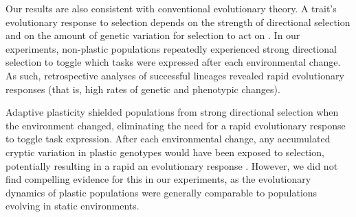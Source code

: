 
Our results are also consistent with conventional evolutionary theory.
A trait's evolutionary response to selection depends on the strength of directional selection and on the amount of genetic variation for selection to act on \citep{lande_measurement_1983,zimmer_evolution_2013}.
In our experiments, non-plastic populations repeatedly experienced strong directional selection to toggle which tasks were expressed after each environmental change.
As such, retrospective analyses of successful lineages revealed rapid evolutionary responses (that is, high rates of genetic and phenotypic changes).

Adaptive plasticity shielded populations from strong directional selection when the environment changed, eliminating the need for a rapid evolutionary response to toggle task expression. 
After each environmental change, any accumulated cryptic variation in plastic genotypes would have been exposed to selection, potentially resulting in a rapid an evolutionary response \citep{wund_assessing_2012}.
However, we did not find compelling evidence for this in our experiments, as the evolutionary dynamics of plastic populations were generally comparable to populations evolving in static environments.

